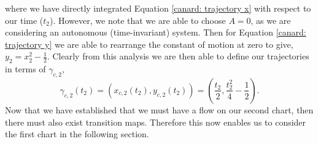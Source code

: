 where we have directly integrated Equation \ref{canard: trajectory x} with respect to our time ($ t_2 $). However, we note that we are able to choose $ A=0 $, as we are considering an autonomous (time-invariant) system. Then for Equation \ref{canard: trajectory y} we are able to rearrange the constant of motion at zero to give, $ y_2=x_2^2-\frac{1}{2} $. Clearly from this analysis we are then able to define our trajectories in terms of $ \gamma_{c,2} $, 
\begin{equation}
\gamma_{c,2}(t_2)=(x_{c,2}(t_2),y_{c,2}(t_2))=\left(\frac{t_2}{2},\frac{t^2_2}{4}-\frac{1}{2}\right).   \label{eq: gamma c2}
\end{equation}
Now that we have established that we must have a flow on our second chart, then there must also exist transition maps. Therefore this now enables us to consider the first chart in the following section.


